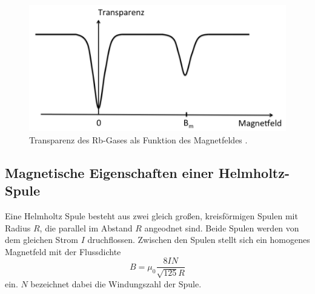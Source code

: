 \begin{figure}[H]
    \centering
    \includegraphics[scale= 0.5]{pictures/TB.png}
    \caption{Transparenz des Rb-Gases als Funktion des Magnetfeldes \cite{V21}.}
    \label{fig:TB}
\end{figure}

\subsection{Magnetische Eigenschaften einer Helmholtz-Spule}
Eine Helmholtz Spule besteht aus zwei gleich großen, kreisförmigen 
Spulen mit Radius $R$, die parallel im Abstand $R$ angeodnet sind. 
Beide Spulen werden von dem gleichen Strom $I$ druchflossen. Zwischen 
den Spulen stellt sich ein homogenes Magnetfeld mit der Flussdichte
\begin{equation}
    B=\mu_0\frac{8IN}{\sqrt{125}R}
    \label{eqn:helmholtz}
\end{equation}
ein. $N$ bezeichnet dabei die Windungszahl der Spule.
